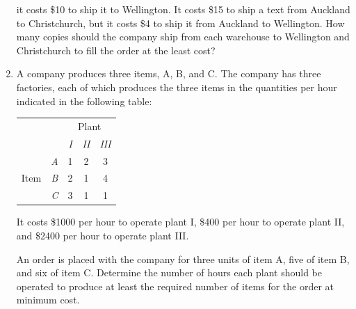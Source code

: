 \documentclass[a4paper,leqno]{article}
\numberwithin{equation}{section}
\theoremstyle{definition}
\theoremstyle{remark}
\begin{document}
\begin{enumerate}
        it costs \$10 to ship it to Wellington. It costs \$15 to ship a text from Auckland to Christchurch, but it costs \$4 to ship it from
        Auckland to Wellington. How many copies should the company ship from each warehouse to Wellington and Christchurch to fill the
        order at the least cost?
  \item A company produces three items, A, B, and C. The company has three factories, each
        of which produces the three items in the quantities per hour indicated in the following table:
        \begin{center}
          \renewcommand{\arraystretch}{1.5}
          \begin{tabular}{  c | c | c | c | c | }
            \multicolumn{1}{r}{} & \multicolumn{1}{r}{} & \multicolumn{3}{c}{Plant} \\ \cline{3-5}
            \multicolumn{1}{r}{} & & \textit{I} & \textit{II} & \textit{III} \\ \cline{2-5}
            \multirow{3}{*}{Item} & \textit{A} & 1 & 2 & 3 \\ \cline{2-5}
            & \textit{B} & 2 & 1 & 4 \\ \cline{2-5}
            & \textit{C} & 3 & 1 & 1 \\ \cline{2-5}
          \end{tabular}
        \end{center}
        It costs \$1000 per hour to operate plant I, \$400 per hour
        to operate plant II, and \$2400 per hour to operate plant III.

        An order is placed with the company for three units of item A, five of item B,
        and six of item C. Determine the number of hours each plant should be operated
        to produce at least the required number of items for the order at minimum cost.
\end{enumerate}
\end{document}

